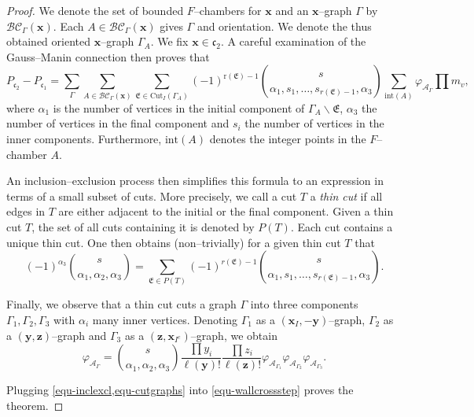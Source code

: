 \documentclass[10pt,a4paper,oneside,no-math,reqno]{amsart}%
\theoremstyle{plain}
\theoremstyle{definition}
\theoremstyle{remark}
\numberwithin{equation}{section}
\renewcommand{\phi}{\varphi}
\newcommand{\1}{\mathds{1}}
\newcommand{\<}{\langle}
\renewcommand{\>}{\rangle}
\begin{document}
\begin{proof}
    We denote the set of bounded $F$--chambers for $\mathbf{x}$ and an $\mathbf{x}$--graph $\Gamma$ by $\mathcal{BC}_{\Gamma}(\mathbf{x})$. Each $A\in\mathcal{BC}_\Gamma(\mathbf{x})$ gives $\Gamma$ and orientation. We denote the thus obtained oriented $\mathbf{x}$--graph $\Gamma_A$.
    We fix $\mathbf{x}\in\mathfrak{c}_2$. A careful examination of the Gauss--Manin connection then proves that
    \begin{equation}
    \label{equ-wallcrossstep}
        P_{\mathfrak{c}_2}-P_{\mathfrak{c}_1}
        =
        \sum_{\Gamma}\sum_{A\in\mathcal{BC}_{\Gamma}(\mathbf{x})}\sum_{\mathfrak{E}\in\mathrm{Cut}_I(\Gamma_A)}(-1)^{\mathrm{r}(\mathfrak{E})-1}\binom{s}{\alpha_1, s_1,\dots, s_{r(\mathfrak{E})-1},\alpha_3}\sum_{\mathrm{int}(A)}\phi_{\mathcal{A}_\Gamma}\prod m_v,
    \end{equation}
    where $\alpha_1$ is the number of vertices in the initial component of $\Gamma_A\backslash\mathfrak{E}$, $\alpha_3$ the number of vertices in the final component and $s_i$ the number of vertices in the inner components. Furthermore, $\mathrm{int}(A)$ denotes the integer points in the $F$--chamber $A$.

    
    An inclusion--exclusion process then simplifies this formula to an expression in terms of a small subset of cuts. More precisely, we call a cut $T$ a \emph{thin cut} if all edges in $T$ are either adjacent to the initial or the final component. Given a thin cut $T$, the set of all cuts containing it is denoted by $P(T)$. Each cut contains a unique thin cut. One then obtains (non--trivially) for a given thin cut $T$ that
    \begin{equation}
    \label{equ-inclexcl}
        (-1)^{\alpha_3}\binom{s}{\alpha_1,\alpha_2,\alpha_3}=\sum_{\mathfrak{E}\in P(T)} (-1)^{r(\mathfrak{E})-1}\binom{s}{\alpha_1, s_1,\dots ,s_{r(\mathfrak{E})-1},\alpha_3}.
    \end{equation}

    Finally, we observe that a thin cut cuts a graph $\Gamma$ into three components $\Gamma_1,\Gamma_2,\Gamma_3$ with $\alpha_i$ many inner vertices. Denoting $\Gamma_1$ as a $(\mathbf{x}_I,-\mathbf{y})$--graph, $\Gamma_2$ as a $(\mathbf{y},\mathbf{z})$--graph and $\Gamma_3$ as a $(\mathbf{z},\mathbf{x}_{I^c})$--graph, we obtain
    \begin{equation}
    \label{equ-cutgraphs}
        \phi_{\mathcal{A}_\Gamma}=\binom{s}{\alpha_1,\alpha_2,\alpha_3}\frac{\prod y_i}{\ell(\mathbf{y})!}\frac{\prod z_i}{\ell(\mathbf{z})!}\phi_{\mathcal{A}_{\Gamma_1}}\phi_{\mathcal{A}_{\Gamma_2}}\phi_{\mathcal{A}_{\Gamma_3}}.
    \end{equation}

    Plugging \cref{equ-inclexcl,equ-cutgraphs} into \cref{equ-wallcrossstep} proves the theorem.
\end{proof}
\end{document}

